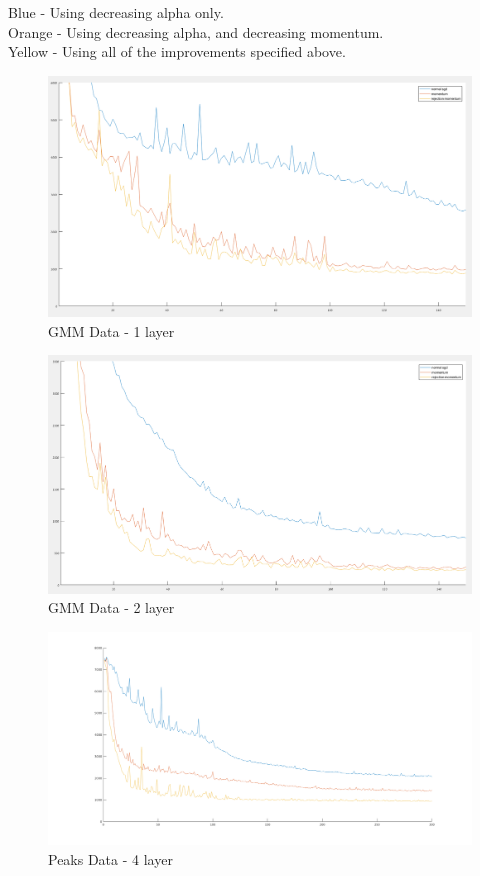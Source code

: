 \documentclass{article}
\numberwithin{equation}{section}
\begin{document}
Blue - Using decreasing alpha only.\\
Orange - Using decreasing alpha, and decreasing momentum.\\
Yellow - Using all of the improvements specified above.\\

\begin{figure}[h!]
  \caption{GMM Data - 1 layer}
  \includegraphics[width=\textwidth]{rej_m_gmm_1layer.png}
\end{figure}

\begin{figure}[h!]
  \caption{GMM Data - 2 layer}
  \includegraphics[width=\textwidth]{rej_m_gmm_2layers.png}
\end{figure}

\begin{figure}[h!]
  \caption{Peaks Data - 4 layer}
  \includegraphics[width=\textwidth]{rej_m_peaks_4layers.png}
\end{figure}
\end{document}
